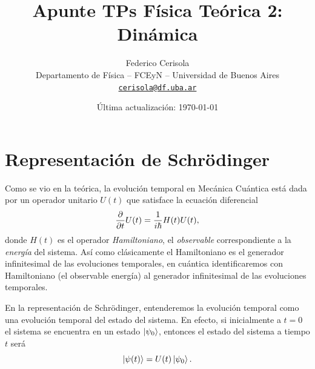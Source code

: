 \documentclass[10pt, a4paper]{article}
\numberwithin{equation}{subsection}
\begin{document}
\title{Apunte TPs Física Teórica 2: Dinámica}
\author{Federico Cerisola
  \\ \small{Departamento de Física -- FCEyN -- Universidad de Buenos Aires}
  \\ \small{\href{mailto:cerisola@df.uba.ar}{\nolinkurl{cerisola@df.uba.ar}}}
}
\date{\small Última actualización: \today}
\maketitle
\thispagestyle{empty}

\vfill
\doclicenseThis

\pagebreak

\newpage
  \tableofcontents
\newpage

\section{Representación de Schrödinger}

Como se vio en la teórica, la evolución temporal en Mecánica Cuántica está dada
por un operador unitario $U(t)$ que satisface la ecuación diferencial
\begin{equation} \label{eq:def_evol_temp_op}
  \pdv{t} U(t) = \frac{1}{i\hbar}H(t)U(t),
\end{equation}
donde $H(t)$ es el operador \emph{Hamiltoniano}, el \emph{observable}
correspondiente a la \emph{energía} del sistema. Así como clásicamente el
Hamiltoniano es el generador infinitesimal de las evoluciones temporales, en
cuántica identificaremos con Hamiltoniano (el observable energía) al generador
infinitesimal de las evoluciones temporales.

En la representación de Schrödinger, entenderemos la evolución temporal como
una evolución temporal del estado del sistema. En efecto, si inicialmente a $t
= 0$ el sistema se encuentra en un estado $\ket{\psi_0}$, entonces el estado
del sistema a tiempo $t$ será
\begin{equation}
  \ket{\psi(t)} = U(t)\ket{\psi_0}.
\end{equation}
\end{document}

